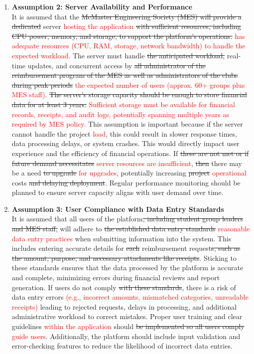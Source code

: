 \documentclass{article}
\begin{document}
\begin{enumerate}
    \item \textbf{Assumption 2: Server Availability and Performance} \\
    It is assumed that the \sout{McMaster Engineering Society (MES) will provide a dedicated} server \textcolor{red}{hosting the application} \sout{with sufficient resources, including CPU power, memory, and storage, to support the platform's operations.} \textcolor{red}{has adequate resources (CPU, RAM, storage, network bandwidth) to handle the expected workload.} The server must handle \sout{the anticipated workload,} real-time updates, and concurrent access by \sout{all administrator of the reimbursement program of the MES as well as administrators of the clubs during peak periods} \textcolor{red}{the expected number of users (approx. 60+ groups plus MES staff)}. \sout{The server's storage capacity should be enough to store financial data for at least 3 years.} \textcolor{red}{Sufficient storage must be available for financial records, receipts, and audit logs, potentially spanning multiple years as required by MES policy.} This assumption is important because if the server cannot handle the project \textcolor{red}{load}, this could result in slower response times, data processing delays, or system crashes. This would directly impact user experience and the efficiency of financial operations. If \sout{these are not met or if future demand necessitates} \textcolor{red}{server resources are insufficient}, \sout{then} there may be a need \sout{to upgrade} \textcolor{red}{for upgrades}, potentially increasing \sout{project} \textcolor{red}{operational} costs \sout{and delaying deployment}. Regular performance monitoring should be planned to ensure server capacity aligns with user demand over time.

    \item \textbf{Assumption 3: User Compliance with Data Entry Standards} \\
    It is assumed that all users of the platform\sout{, including student group leaders and MES staff,} will adhere to \sout{the established data entry standards} \textcolor{red}{reasonable data entry practices} when submitting information into the system. This includes entering accurate details for \sout{each} reimbursement request\sout{s, such as the amount, purpose, and necessary attachments like receipts}. Sticking to these standards ensures that the data processed by the platform is accurate and complete, minimizing errors during financial reviews and report generation. If users do not comply \sout{with these standards}, there is a risk of data entry errors \textcolor{red}{(e.g., incorrect amounts, mismatched categories, unreadable receipts)} leading to rejected requests, delays in processing, and additional administrative workload to correct mistakes. Proper user training and clear guidelines \textcolor{red}{within the application} should \sout{be implemented so all users comply} \textcolor{red}{guide users}. Additionally, the platform should include input validation and error-checking features to reduce the likelihood of incorrect data entries.


\end{enumerate}
\end{document}
